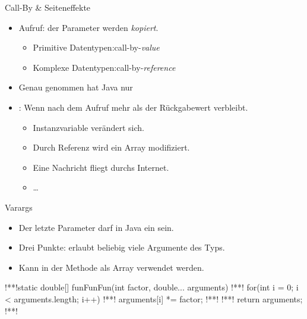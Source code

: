 {\newsavebox\agentpingu
\savebox\agentpingu{\tikz\pingu[cloak=pingu@black,sunglasses,tie=pingu@black,eyes angry,glasses opacity=.876];}
\begin{frame}[c]{Call-By \& Seiteneffekte}
   \vspace*{.75\baselineskip}\begin{itemize}
      \itemsep11pt
      \item<3-> Aufruf:  der Parameter werden \textit{kopiert}.
      \begin{itemize}
         \item<4-> Primitive Datentypen:\hfill call-by-\textit{value}
         \item<5-> Komplexe Datentypen:\hfill call-by-\textit{reference}
      \end{itemize}
      \item<6-> Genau genommen hat Java nur 
      \item<7-> : Wenn nach dem Aufruf mehr als der Rückgabewert verbleibt. \begin{itemize}
         \item<8-> Instanzvariable verändert sich.
         \item<9-> Durch Referenz wird ein Array modifiziert.
         \item<10-> Eine Nachricht fliegt durchs Internet.
         \item<11-> \ldots
      \end{itemize}
   \end{itemize}
\end{frame}

\begin{frame}[fragile,c]{Varargs}
   \begin{itemize}[<+(1)->]
      \itemsep11pt
      \item Der letzte Parameter darf in Java ein  sein.
      \item Drei Punkte: erlaubt beliebig viele Argumente des Typs.
      \item Kann in der Methode als Array verwendet werden.\vspace*{-2\baselineskip}
   \end{itemize}
\begin{layout-imageonly}
\begin{plainjava}
!**!static double[] funFunFun(int factor, double... arguments) {
!**!   for(int i = 0; i < arguments.length; i++) {
!**!      arguments[i] *= factor;
!**!   }
!**!   return arguments;
!**!}
\end{plainjava}
\end{layout-imageonly}
\end{frame}


}
